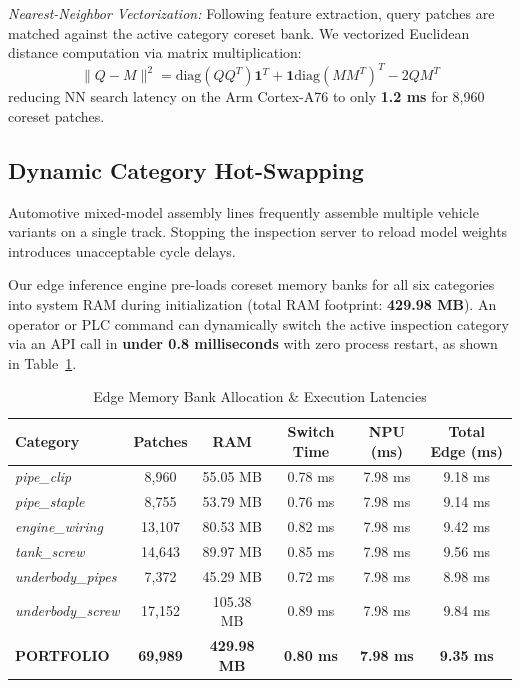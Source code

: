\documentclass[journal,twocolumn]{IEEEtran}
\begin{document}
\textit{Nearest-Neighbor Vectorization:} Following feature extraction, query patches are matched against the active category coreset bank. We vectorized Euclidean distance computation via matrix multiplication:
\begin{equation}
\| Q - M \|^2 = \text{diag}(Q Q^T) \mathbf{1}^T + \mathbf{1} \text{diag}(M M^T)^T - 2 Q M^T
\end{equation}
reducing NN search latency on the Arm Cortex-A76 to only \textbf{1.2 ms} for 8,960 coreset patches.

\subsection{Dynamic Category Hot-Swapping}
Automotive mixed-model assembly lines frequently assemble multiple vehicle variants on a single track. Stopping the inspection server to reload model weights introduces unacceptable cycle delays.

Our edge inference engine pre-loads coreset memory banks for all six categories into system RAM during initialization (total RAM footprint: \textbf{429.98 MB}). An operator or PLC command can dynamically switch the active inspection category via an API call in \textbf{under 0.8 milliseconds} with zero process restart, as shown in Table~\ref{tab:hot_swap}.

\begin{table}[t]
\caption{Edge Memory Bank Allocation \& Execution Latencies}
\label{tab:hot_swap}
\centering
\scriptsize
\begin{tabular}{lccccc}
\toprule
\textbf{Category} & \textbf{Patches} & \textbf{RAM} & \textbf{Switch Time} & \textbf{NPU (ms)} & \textbf{Total Edge (ms)} \\
\midrule
\textit{pipe\_clip} & 8,960 & 55.05 MB & 0.78 ms & 7.98 ms & 9.18 ms \\
\textit{pipe\_staple} & 8,755 & 53.79 MB & 0.76 ms & 7.98 ms & 9.14 ms \\
\textit{engine\_wiring} & 13,107 & 80.53 MB & 0.82 ms & 7.98 ms & 9.42 ms \\
\textit{tank\_screw} & 14,643 & 89.97 MB & 0.85 ms & 7.98 ms & 9.56 ms \\
\textit{underbody\_pipes} & 7,372 & 45.29 MB & 0.72 ms & 7.98 ms & 8.98 ms \\
\textit{underbody\_screw} & 17,152 & 105.38 MB & 0.89 ms & 7.98 ms & 9.84 ms \\
\midrule
\textbf{PORTFOLIO} & \textbf{69,989} & \textbf{429.98 MB} & \textbf{0.80 ms} & \textbf{7.98 ms} & \textbf{9.35 ms} \\
\bottomrule
\end{tabular}
\end{table}
\end{document}

